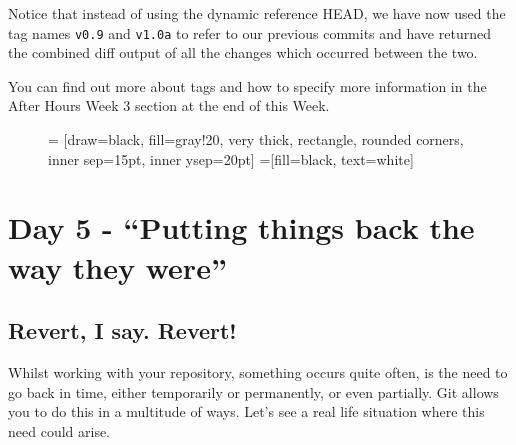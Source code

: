 Notice that instead of using the dynamic reference HEAD, we have now used the tag names \texttt{v0.9} and \texttt{v1.0a} to refer to our previous commits and have returned the combined diff output of all the changes which occurred between the two.

You can find out more about tags and how to specify more information in the {After Hours Week 3} section at the end of this Week.

\begin{figure}[hbt]
 = [draw=black, fill=gray!20, very thick, rectangle, rounded corners, inner sep=15pt, inner ysep=20pt]
 =[fill=black, text=white]
\end{figure}

\section{Day 5 - ``Putting things back the way they were''}
\subsection{Revert, I say.  Revert!}

Whilst working with your repository, something occurs quite often, is the need to go back in time, either temporarily or permanently, or even partially.  Git allows you to do this in a multitude of ways.  Let's see a real life situation where this need could arise.

